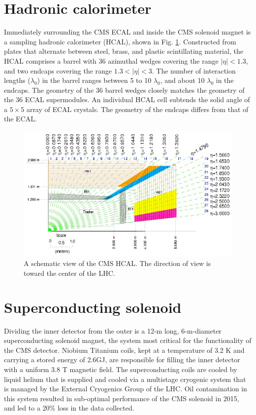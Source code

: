 \section{Hadronic calorimeter}
Immediately surrounding the CMS ECAL and inside the CMS solenoid magnet is a sampling hadronic calorimeter (HCAL), shown in Fig. \ref{fig:HCalLayout}. Constructed from plates that alternate between steel, brass, and plastic scintillating material, the HCAL comprises a barrel with 36 azimuthal wedges covering the range $|\eta|<1.3$, and two endcaps covering the range $1.3<|\eta|<3$. The number of interaction lengths ($\lambda_{0}$) in the barrel ranges between 5 to 10 $\lambda_{0}$, and about 10 $\lambda_{0}$ in the endcaps. The geometry of the 36 barrel wedges closely matches the geometry of the 36 ECAL supermodules. An individual HCAL cell subtends the solid angle of a $5\times5$ array of ECAL crystals. The geometry of the endcaps differs from that of the ECAL.
\begin{figure}[h]
\centering
\includegraphics[width=0.95\linewidth]{figures/CMS/HCalLayout.jpg}
\caption{A schematic view of the CMS HCAL. The direction of view is toward the center of the LHC.} 
\label{fig:HCalLayout}
\end{figure}
\FloatBarrier


\section{Superconducting solenoid}
Dividing the inner detector from the outer is a 12-m long, 6-m-diameter superconducting solenoid magnet, the system most critical for the functionality of the CMS detector. Niobium Titanium coils, kept at a temperature of 3.2 K and carrying a stored energy of 2.6GJ, are responsible for filling the inner detector with a uniform 3.8 T magnetic field. The superconducting coils are cooled by liquid helium that is supplied and cooled via a multistage cryogenic system that is managed by the External Cryogenics Group of the LHC. Oil contamination in this system resulted in sub-optimal performance of the CMS solenoid in 2015, and led to a 20\% loss in the data collected.

